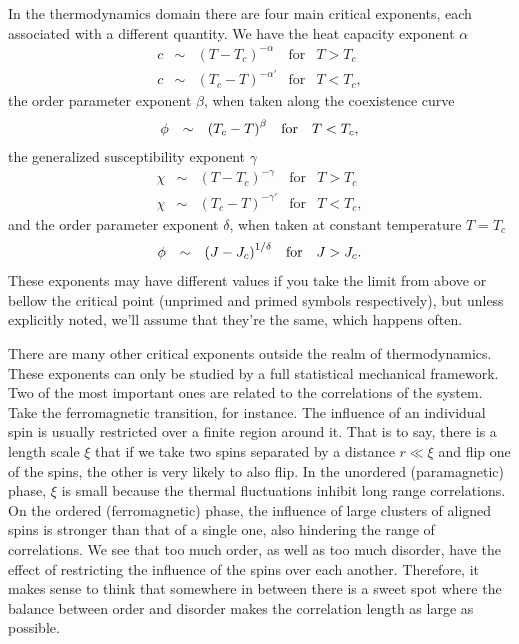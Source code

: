 In the thermodynamics domain there are four main critical exponents, each
associated with a different quantity. We have the heat capacity exponent
$\alpha$
\begin{equation}
    \label{eq:heatc}
    \begin{array}{ccccc}
        c & \sim & {\left(T-T_c\right)}^{-\alpha}  & \mbox{for} & T > T_c \\
        c & \sim & {\left(T_c-T\right)}^{-\alpha'} & \mbox{for} & T < T_c,
    \end{array}
\end{equation}
the order parameter exponent $\beta$, when taken along the coexistence curve 
\begin{equation}
    \begin{array}{ccccc}
        \phi  & \sim & {\left(T_c-T\right)}^{\beta} & \mbox{for} & T < T_c,
    \end{array}
\end{equation}
the generalized susceptibility exponent $\gamma$
\begin{equation}
    \begin{array}{ccccc}
        \chi  & \sim & {\left(T-T_c\right)}^{-\gamma}  & \mbox{for} & T > T_c \\
        \chi  & \sim & {\left(T_c-T\right)}^{-\gamma'} & \mbox{for} & T < T_c,
    \end{array}
\end{equation}
and the order parameter exponent $\delta$, when taken at constant temperature
$T=T_c$
\begin{equation}
    \begin{array}{ccccc}
        \phi  & \sim & {\left(J-J_c\right)}^{1/\delta} & \mbox{for} & J > J_c.
    \end{array}
\end{equation}
These exponents may have different values if you take the limit from above or
bellow the critical point (unprimed and primed symbols respectively), but
unless explicitly noted, we'll assume that they're the same, which happens
often.

There are many other critical exponents outside the realm of thermodynamics.
These exponents can only be studied by a full statistical mechanical framework.
Two of the most important ones are related to the correlations of the system.
Take the ferromagnetic transition, for instance. The influence of an individual
spin is usually restricted over a finite region around it. That is to say,
there is a length scale $\xi$ that if we take two spins separated by a distance
$r\ll\xi$ and flip one of the spins, the other is very likely to also flip. In
the unordered (paramagnetic) phase, $\xi$ is small because the thermal
fluctuations inhibit long range correlations. On the ordered (ferromagnetic)
phase, the influence of large clusters of aligned spins is stronger than that
of a single one, also hindering the range of correlations. We see that too
much order, as well as too much disorder, have the effect of restricting the
influence of the spins over each another. Therefore, it makes sense to think
that somewhere in between there is a sweet spot where the balance between order
and disorder makes the correlation length as large as possible.

